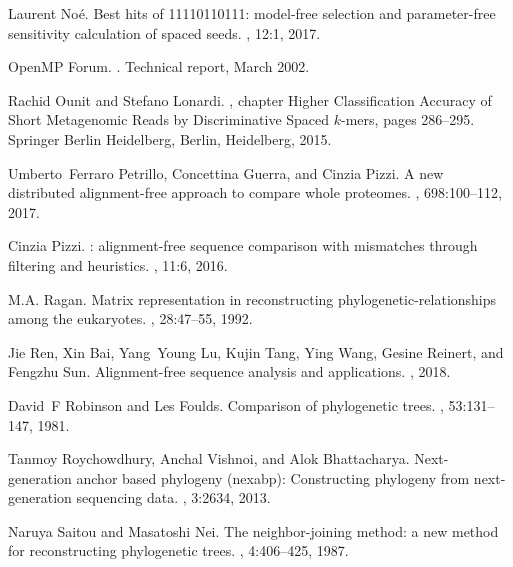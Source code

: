 \documentclass[review]{elsarticle}
\begin{document}
{\begin{thebibliography}{10}
Laurent No{\'e}.
\newblock Best hits of 11110110111: model-free selection and parameter-free
  sensitivity calculation of spaced seeds.
, 12:1, 2017.

{OpenMP Forum}.
.
\newblock Technical report, March 2002.

Rachid Ounit and Stefano Lonardi.
, chapter Higher
  Classification Accuracy of Short Metagenomic Reads by Discriminative Spaced
  $k$-mers, pages 286--295.
\newblock Springer Berlin Heidelberg, Berlin, Heidelberg, 2015.

Umberto~Ferraro Petrillo, Concettina Guerra, and Cinzia Pizzi.
\newblock A new distributed alignment-free approach to compare whole proteomes.
, 698:100--112, 2017.

Cinzia Pizzi.
: alignment-free sequence comparison with mismatches through
  filtering and heuristics.
, 11:6, 2016.

M.A. Ragan.
\newblock Matrix representation in reconstructing phylogenetic-relationships
  among the eukaryotes.
, 28:47--55, 1992.

Jie Ren, Xin Bai, Yang~Young Lu, Kujin Tang, Ying Wang, Gesine Reinert, and
  Fengzhu Sun.
\newblock Alignment-free sequence analysis and applications.
, 2018.

David~F Robinson and Les Foulds.
\newblock Comparison of phylogenetic trees.
, 53:131--147, 1981.

Tanmoy Roychowdhury, Anchal Vishnoi, and Alok Bhattacharya.
\newblock Next-generation anchor based phylogeny (nexabp): Constructing
  phylogeny from next-generation sequencing data.
, 3:2634, 2013.

Naruya Saitou and Masatoshi Nei.
\newblock The neighbor-joining method: a new method for reconstructing
  phylogenetic trees.
, 4:406--425, 1987.


\end{thebibliography}}
\end{document}
